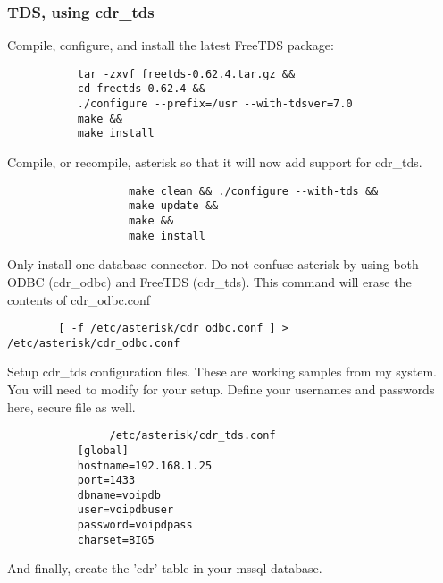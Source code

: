 \subsubsection{TDS, using cdr_tds}
		Compile, configure, and install the latest FreeTDS package:
\begin{astlisting}
\begin{verbatim}
		   tar -zxvf freetds-0.62.4.tar.gz &&
		   cd freetds-0.62.4 &&
		   ./configure --prefix=/usr --with-tdsver=7.0
		   make &&
		   make install
\end{verbatim}
\end{astlisting}
                Compile, or recompile, asterisk so that it will now add support
                for cdr_tds.
\begin{astlisting}
\begin{verbatim}
                   make clean && ./configure --with-tds &&
                   make update &&
                   make &&
                   make install
\end{verbatim}
\end{astlisting}
                Only install one database connector.  Do not confuse asterisk
                by using both ODBC (cdr_odbc) and FreeTDS (cdr_tds).
                This command will erase the contents of cdr_odbc.conf
\begin{astlisting}
\begin{verbatim}
		[ -f /etc/asterisk/cdr_odbc.conf ] > /etc/asterisk/cdr_odbc.conf
\end{verbatim}
\end{astlisting}
                Setup cdr_tds configuration files.  These are working samples
                from my system.  You will need to modify for your setup. Define
                your usernames and passwords here, secure file as well.
\begin{astlisting}
\begin{verbatim}
                /etc/asterisk/cdr_tds.conf
		   [global]
		   hostname=192.168.1.25
		   port=1433
		   dbname=voipdb
		   user=voipdbuser
		   password=voipdpass
		   charset=BIG5
\end{verbatim}
\end{astlisting}
                And finally, create the 'cdr' table in your mssql database.

